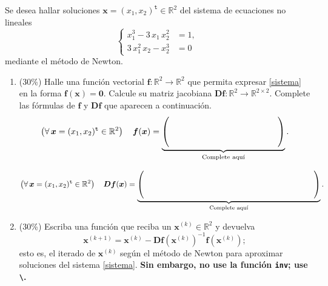 Se desea hallar soluciones $\boldsymbol{x} = (x_1, x_2)^\mathtt{t} \in \mathbb{R}^2$ del sistema de ecuaciones no lineales
%
\begin{equation}\label{sistema}
\left\{
\begin{aligned}
x_1^3 - 3 \, x_1 \, x_2^2 & = 1,\\
3 \, x_1^2 \, x_2 - x_2^3 & = 0
\end{aligned}
\right.
\end{equation}
%
mediante el m\'etodo de Newton.

\begin{enumerate}
\item\label{it:f_and_Df} (30\%) Halle una funci\'on vectorial $\boldsymbol{f} \colon \mathbb{R}^2 \to \mathbb{R}^2$ que permita expresar \eqref{sistema} en la forma $\boldsymbol{f}(\boldsymbol{x}) = \boldsymbol{0}$.
Calcule su matriz jacobiana $\boldsymbol{D} \boldsymbol{f} \colon \mathbb{R}^2 \to \mathbb{R}^{2 \times 2}$.
Complete las f\'ormulas de $\boldsymbol{f}$ y $\boldsymbol{D} \boldsymbol{f}$ que aparecen a continuaci\'on.
%
\newcommand{\anchoextra}{\rule{3em}{0pt}}
\begin{equation}\label{f}
\left(\forall\,\boldsymbol{x} = (x_1, x_2)^\mathtt{t} \in \mathbb{R}^2\right) \quad \boldsymbol{f}(\boldsymbol{x}) =
\underbrace{%
\begin{pmatrix}
\anchoextra\phantom{x_1^3 - 3 \, x_1 \, x_2^2 - 1}\anchoextra\\[3ex]
\anchoextra\phantom{3 \, x_1^2 \, x_2 - x_2^3}\anchoextra
\end{pmatrix}}_{\text{Complete aqu\'i}}.
\end{equation}

\begin{equation}\label{Df}
\left(\forall\,\boldsymbol{x} = (x_1, x_2)^\mathtt{t} \in \mathbb{R}^2\right) \quad \boldsymbol{D} \boldsymbol{f}(\boldsymbol{x}) =
\underbrace{%
\begin{pmatrix}
\anchoextra\phantom{3\, x_1^2 - 3\, x_2^2}\anchoextra & \anchoextra\phantom{-6 \, x_1 \, x_2}\anchoextra\\[3ex]
\anchoextra\phantom{6 \, x_1 \, x_2}\anchoextra & \anchoextra\phantom{3\, x_1^2 - 3 \, x_2^2}\anchoextra
\end{pmatrix}}_{\text{Complete aqu\'i}}.
\end{equation}

\item\label{it:it} (30\%) Escriba una funci\'on \matlab que reciba un $\boldsymbol{x}^{(k)} \in \mathbb{R}^2$ y devuelva
%
\begin{equation*}
\boldsymbol{x}^{(k+1)} = \boldsymbol{x}^{(k)} - \boldsymbol{D}\boldsymbol{f}(\boldsymbol{x}^{(k)})^{-1} \boldsymbol{f}(\boldsymbol{x}^{(k)});
\end{equation*}
%
esto es, el iterado de $\boldsymbol{x}^{(k)}$ seg\'un el m\'etodo de Newton para aproximar soluciones del sistema \eqref{sistema}.
\textbf{Sin embargo, no use la funci\'on \texttt{inv}; use \texttt{\textbackslash}.}


\end{enumerate}

